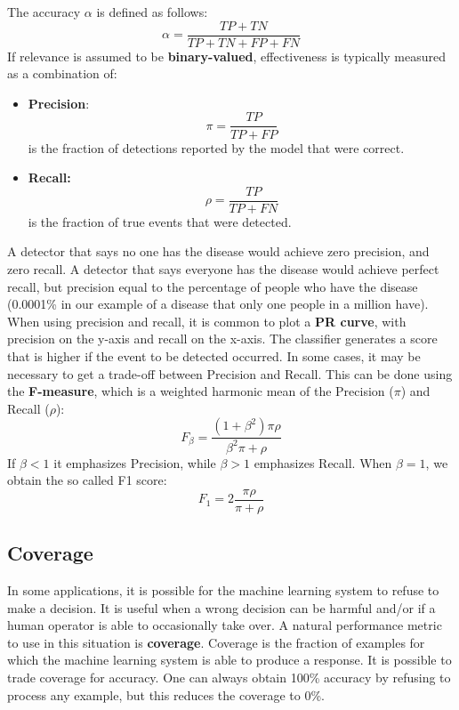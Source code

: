 The accuracy $\alpha$ is defined as follows:
\[\alpha = \frac{TP + TN}{TP + TN + FP + FN}\]
If relevance is assumed to be \textbf{binary-valued}, effectiveness is typically measured as a combination of:
\begin{itemize}
    \item \textbf{Precision}: 
    \[\pi = \frac{TP}{TP + FP}\]
    is the fraction of detections reported by the model that were correct.

    \item \textbf{Recall:}
    \[\rho = \frac{TP}{TP + FN}\]
    is the fraction of true events that were detected.
\end{itemize}
A detector that says no one has the disease would achieve
zero precision, and zero recall. A detector that says everyone has the disease would achieve perfect recall, but precision equal to the percentage of people who have the disease (0.0001\% in our example of a disease that only one people in a million have).\newline\newline
When using precision and recall, it is common to plot a \textbf{PR curve}, with precision on the y-axis and recall on the x-axis. The classifier generates a score
that is higher if the event to be detected occurred.
\newline\newline
In some cases, it may be necessary to get a trade-off between Precision and Recall. This can be done using the \textbf{F-measure}, which is a weighted harmonic mean of the Precision ($\pi$) and Recall ($\rho$):
\[F_{\beta} = \frac{(1 + \beta^{2})\pi \rho}{\beta^{2}\pi + \rho}\]
If $\beta < 1$ it emphasizes Precision, while $\beta > 1$ emphasizes Recall. When $\beta = 1$, we obtain the so called F1 score:
\[F_{1} = 2\frac{\pi\rho}{\pi + \rho}\]

\subsection{Coverage}
In some applications, it is possible for the machine learning system to refuse to make a decision. It is useful when a wrong decision can be harmful and/or if a human operator is able to occasionally take over. A natural performance metric to use in this situation is \textbf{coverage}. Coverage is the fraction of examples for which the machine learning system is able to produce a response. It is possible to trade coverage for accuracy. One can always obtain 100\% accuracy
by refusing to process any example, but this reduces the coverage to 0\%.


